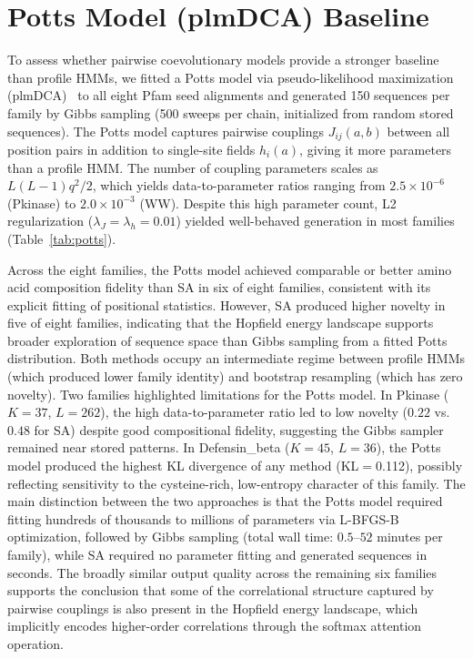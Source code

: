 \documentclass[10pt]{article}
\begin{document}
\section{Potts Model (plmDCA) Baseline}\label{si:potts}

To assess whether pairwise coevolutionary models provide a stronger baseline than profile HMMs, we fitted a Potts model via pseudo-likelihood maximization (plmDCA)~\cite{ekeberg2013improved} to all eight Pfam seed alignments and generated 150 sequences per family by Gibbs sampling (500 sweeps per chain, initialized from random stored sequences). The Potts model captures pairwise couplings $J_{ij}(a,b)$ between all position pairs in addition to single-site fields $h_i(a)$, giving it more parameters than a profile HMM. The number of coupling parameters scales as $L(L{-}1)q^2/2$, which yields data-to-parameter ratios ranging from $2.5 \times 10^{-6}$ (Pkinase) to $2.0 \times 10^{-3}$ (WW). Despite this high parameter count, L2 regularization ($\lambda_J{=}\lambda_h{=}0.01$) yielded well-behaved generation in most families (Table~\ref{tab:potts}).

Across the eight families, the Potts model achieved comparable or better amino acid composition fidelity than SA in six of eight families, consistent with its explicit fitting of positional statistics. However, SA produced higher novelty in five of eight families, indicating that the Hopfield energy landscape supports broader exploration of sequence space than Gibbs sampling from a fitted Potts distribution. Both methods occupy an intermediate regime between profile HMMs (which produced lower family identity) and bootstrap resampling (which has zero novelty). Two families highlighted limitations for the Potts model. In Pkinase ($K{=}37$, $L{=}262$), the high data-to-parameter ratio led to low novelty ($0.22$ vs.\ $0.48$ for SA) despite good compositional fidelity, suggesting the Gibbs sampler remained near stored patterns. In Defensin\_beta ($K{=}45$, $L{=}36$), the Potts model produced the highest KL divergence of any method (KL$=$0.112), possibly reflecting sensitivity to the cysteine-rich, low-entropy character of this family. The main distinction between the two approaches is that the Potts model required fitting hundreds of thousands to millions of parameters via L-BFGS-B optimization, followed by Gibbs sampling (total wall time: $0.5$--$52$ minutes per family), while SA required no parameter fitting and generated sequences in seconds. The broadly similar output quality across the remaining six families supports the conclusion that some of the correlational structure captured by pairwise couplings is also present in the Hopfield energy landscape, which implicitly encodes higher-order correlations through the softmax attention operation.
\end{document}
